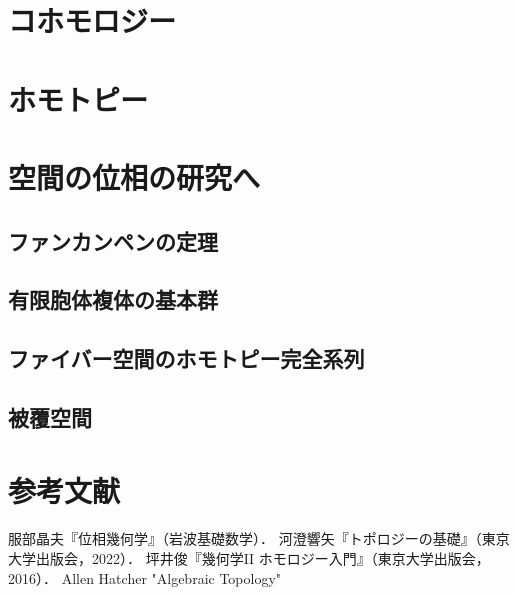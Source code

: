 \documentclass[uplatex, dvipdfmx]{jsreport}
\begin{document}
\chapter{コホモロジー}

\chapter{ホモトピー}

\chapter{空間の位相の研究へ}

\section{ファンカンペンの定理}

\section{有限胞体複体の基本群}

\section{ファイバー空間のホモトピー完全系列}

\section{被覆空間}

\chapter{参考文献}

\begin{thebibliography}{99}
    服部晶夫『位相幾何学』（岩波基礎数学）．
    河澄響矢『トポロジーの基礎』（東京大学出版会，2022）．
    坪井俊『幾何学II ホモロジー入門』（東京大学出版会，2016）．
    Allen Hatcher "Algebraic Topology" 
\end{thebibliography}
\end{document}
